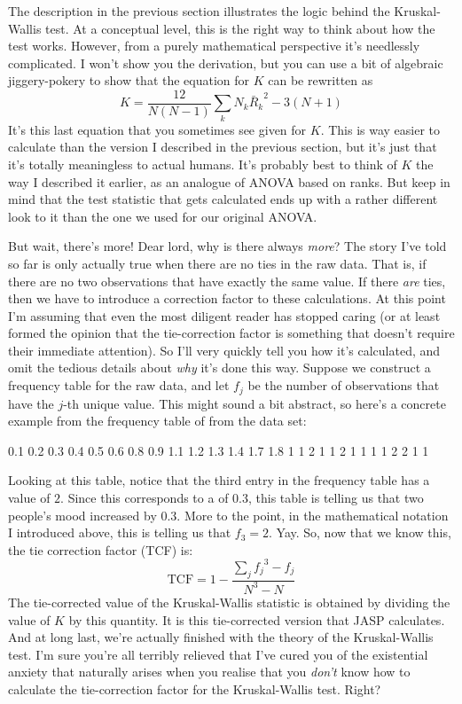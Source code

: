 \begin{mdframed}[style=MyFrame,nobreak=false]
The description in the previous section illustrates the logic behind the Kruskal-Wallis test. At a conceptual level, this is the right way to think about how the test works. However, from a purely mathematical perspective it's needlessly complicated. I won't show you the derivation, but you can use a bit of algebraic jiggery-pokery to show that the equation for $K$ can be rewritten as 
$$
K = \frac{12}{N(N-1)} \sum_k N_k {\bar{R}_k}^2    -  3(N+1)
$$
It's this last equation that you sometimes see given for $K$. This is way easier to calculate than the version I described in the previous section, but it's just that it's totally meaningless to actual humans. It's probably best to think of $K$ the way I described it earlier, as an analogue of ANOVA based on ranks. But keep in mind that the test statistic that gets calculated ends up with a rather different look to it than the one we used for our original ANOVA.

But wait, there's more! Dear lord, why is there always {\it more}? The story I've told so far is only actually true when there are no ties in the raw data. That is, if there are no two observations that have exactly the same value. If there {\it are} ties, then we have to introduce a correction factor to these calculations. At this point I'm assuming that even the most diligent reader has stopped caring (or at least formed the opinion that the tie-correction factor is something that doesn't require their immediate attention). So I'll very quickly tell you how it's calculated, and omit the tedious details about {\it why} it's done this way. Suppose we construct a frequency table for the raw data, and let $f_j$ be the number of observations that have the $j$-th unique value. This might sound a bit abstract, so here's a concrete example from the frequency table of  from the  data set:
\begin{rblock1}
0.1 0.2 0.3 0.4 0.5 0.6 0.8 0.9 1.1 1.2 1.3 1.4 1.7 1.8 
  1   1   2   1   1   2   1   1   1   1   2   2   1   1 
\end{rblock1}
Looking at this table, notice that the third entry in the frequency table has a value of $2$. Since this corresponds to a  of 0.3, this table is telling us that two people's mood increased by 0.3. More to the point, in the mathematical notation I introduced above, this is telling us that $f_3 = 2$. Yay. So, now that we know this, the tie correction factor (TCF) is:
$$
\mbox{TCF} = 1 - \frac{\sum_j {f_j}^3 - f_j}{N^3 - N} 
$$
The tie-corrected value of the Kruskal-Wallis statistic is obtained by dividing the value of $K$ by this quantity. It is this tie-corrected version that JASP calculates. And at long last, we're actually finished with the theory of the Kruskal-Wallis test. I'm sure you're all terribly relieved that I've cured you of the existential anxiety that naturally arises when you realise that you {\it don't} know how to calculate the tie-correction factor for the Kruskal-Wallis test. Right?
\end{mdframed}


